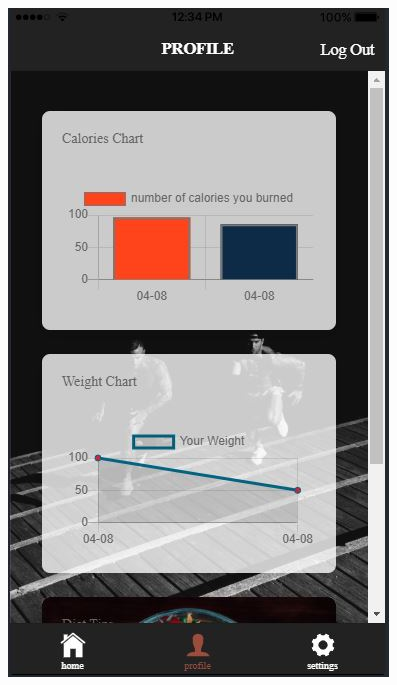 \documentclass[a4paper,12pt]{article}
\begin{document}
\begin{figure}[!htb]
			\endminipage\hfill
			  \includegraphics[width=\linewidth]{lesson6}
			\endminipage\hfill

\end{figure}
\end{document}
